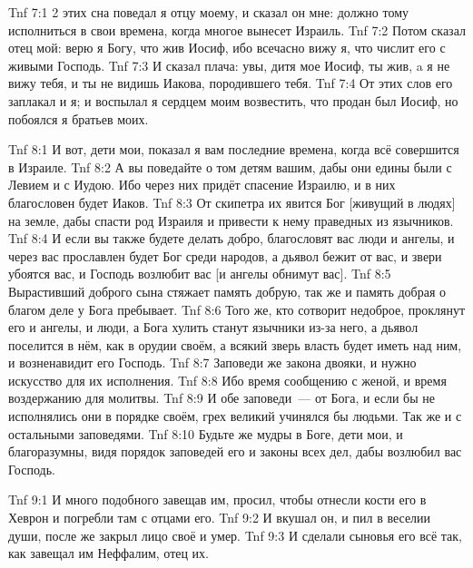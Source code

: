 \vs Tnf 7:1
2 этих сна поведал я отцу моему, и сказал он мне:
должно тому исполниться в свои времена,
когда многое вынесет Израиль.
\vs Tnf 7:2
Потом сказал отец мой:
верю я Богу, что жив Иосиф, ибо всечасно вижу я,
что числит его с живыми Господь.
\vs Tnf 7:3
И сказал плача: увы, дитя мое Иосиф, ты жив,
a я не вижу тебя, и ты не видишь Иакова,
породившего тебя.
\vs Tnf 7:4
От этих слов его заплакал и я;
и воспылал я сердцем моим возвестить,
что продан был Иосиф, но побоялся я братьев моих.

\vs Tnf 8:1
И вот, дети мои, показал я вам последние времена,
когда всё совершится в Израиле.
\vs Tnf 8:2
А вы поведайте о том детям вашим,
дабы они едины были с Левием и с Иудою.
Ибо через них придёт спасение Израилю,
и в них благословен будет Иаков.
\vs Tnf 8:3
От скипетра их явится Бог [живущий в людях] на земле,
дабы спасти род Израиля и привести к нему праведных из язычников.
\vs Tnf 8:4
И если вы также будете делать добро,
благословят вас люди и ангелы,
и через вас прославлен будет Бог среди народов,
а дьявол бежит от вас, и звери убоятся вас,
и Господь возлюбит вас [и ангелы обнимут вас].
\vs Tnf 8:5
Вырастивший доброго сына стяжает память добрую,
так же и память добрая о благом деле у Бога пребывает.
\vs Tnf 8:6
Того же, кто сотворит недоброе, проклянут его и ангелы,
и люди, а Бога хулить станут язычники из-за него,
а дьявол поселится в нём, как в орудии своём,
а всякий зверь власть будет иметь над ним,
и возненавидит его Господь.
\vs Tnf 8:7
Заповеди же закона двояки, и нужно искусство для их исполнения.
\vs Tnf 8:8
Ибо время сообщению с женой, и время воздержанию для молитвы.
\vs Tnf 8:9
И обе заповеди~--- от Бога,
и если бы не исполнялись они в порядке своём,
грех великий учинялся бы людьми.
Так же и с остальными заповедями.
\vs Tnf 8:10
Будьте же мудры в Боге, дети мои, и благоразумны,
видя порядок заповедей его и законы всех дел,
дабы возлюбил вас Господь.

\vs Tnf 9:1
И много подобного завещав им, просил,
чтобы отнесли кости его в Хеврон и погребли там с отцами его.
\vs Tnf 9:2
И вкушал он, и пил в веселии души, после же закрыл лицо своё и умер.
\vs Tnf 9:3
И сделали сыновья его всё так, как завещал им Неффалим, отец их.
